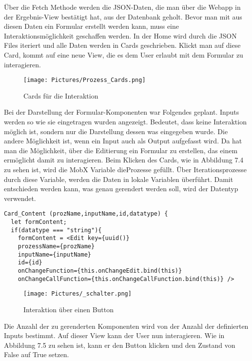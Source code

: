 \documentclass[a4paper,11pt]{scrreprt}
\begin{document}
Über die Fetch Methode werden die JSON-Daten, die man über die Webapp in der Ergebnis-View bestätigt hat, aus der Datenbank geholt. Bevor man mit aus diesen Daten ein Formular erstellt werden kann, muss eine Interaktionsmöglichkeit geschaffen werden. 
In der Home wird durch die JSON Files iteriert und alle Daten werden in Cards geschrieben. Klickt man auf diese Card, kommt auf eine neue View, die es dem User erlaubt mit dem Formular zu interagieren.
\begin{figure}[ht]
\centering
\texttt{[image: Pictures/Prozess\_Cards.png]}
\caption{Cards für die Interaktion}
\label{JSON Bildung über Boxen}
\end{figure}
\hfill \break

Bei der Darstellung der Formular-Komponenten war Folgendes geplant. 
Inputs werden so wie sie eingetragen wurden angezeigt. Bedeutet, dass keine Interaktion möglich ist, sondern nur die Darstellung dessen was eingegeben wurde. Die andere Möglichkeit ist, wenn ein Input auch als Output aufgefasst wird. Da hat man die Möglichkeit, über die Editierung ein Formular zu erstellen, das einem ermöglicht damit zu interagieren.
\hfill \break
\hfill \break
Beim Klicken des Cards, wie in Abbildung 7.4 zu sehen ist, wird die MobX Variable dieProzesse gefüllt. Über Iterationsprozesse durch diese Variable, werden die Daten in lokale Variablen überführt. 
Damit entschieden werden kann, was genau gerendert werden soll, wird der Datentyp verwendet. 
\begin{lstlisting}
Card_Content (prozName,inputName,id,datatype) {
  let formContent;
  if(datatype === "string"){
    formContent = <Edit key={uuid()}
    prozessName={prozName}
    inputName={inputName}
    id={id}
    onChangeFunction={this.onChangeEdit.bind(this)}
    onChangeCallFunction={this.onChangeCallFunction.bind(this)} />
\end{lstlisting}
\begin{figure}[ht]
\centering
\texttt{[image: Pictures/\_schalter.png]}
\caption{Interaktion über einen Button}
\label{JSON Bildung über Boxen}
\end{figure}
\hfill \break
Die Anzahl der zu gerenderten Komponenten wird von der Anzahl der definierten Inputs bestimmt. Auf dieser View kann der User nun interagieren. Wie in Abbildung 7.5 zu sehen ist, kann er den Button klicken und den Zustand von False auf True setzen. 
\end{document}
